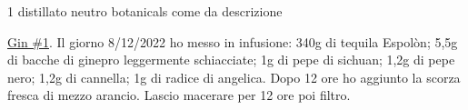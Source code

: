 \serves{-}%
\cooktime[]{-}%
\begin{ingreds}
	1 distillato neutro
	botanicals come da descrizione



\end{ingreds}

\begin{method}
\underline{Gin \#1}. Il giorno 8/12/2022 ho messo in infusione: 340g di tequila Espolòn; 5,5g di bacche di ginepro leggermente schiacciate; 1g di pepe di sichuan; 1,2g di pepe nero; 1,2g di cannella; 1g di radice di angelica. Dopo 12 ore ho aggiunto la scorza fresca di mezzo arancio. Lascio macerare per 12 ore poi filtro.



\end{method}




